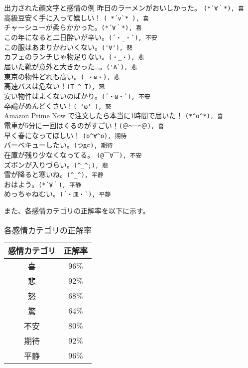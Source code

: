 \documentclass[11pt,a4j]{jsarticle}
\begin{document}
\begin{itembox}[l]{出力された顔文字と感情の例}
  昨日のラーメンがおいしかった。 \verb|(*´∀｀*), 喜| \\
高級豆安く手に入って嬉しい！ \verb|( *´v`* ), 喜| \\
チャーシューが柔らかかった。\verb|(*´∀｀*), 喜|\\
この年になると二日酔いが辛い。\verb|(´・_・`), 不安|\\
この服はあまりかわいくない。\verb|('∀'), 悲|\\
カフェのランチじゃ物足りない。\verb|(・_・), 悲|\\
届いた靴が意外と大きかった…。\verb|('A`), 悲|\\
東京の物件どれも高い。\verb|( ・ω・), 悲|\\
高速バスは危ない！\verb|(T ^ T), 怒|\\
安い物件はよくないのばかり。\verb|(´・ω・`), 不安|\\
卒論がめんどくさい！\verb|( 'ω' ), 怒|\\
Amazon Prime Now で注文したら本当に1時間で届いた！ \verb|(*^o^*), 喜|\\
電車が5分に一回はくるのがすごい！\verb|(＠⌒ー⌒＠), 喜|\\
早く春になってほしい！ \verb|(o^∀^o), 期待|\\
バーベキューしたい。\verb|(つд⊂), 期待|\\
在庫が残り少なくなってる。 \verb|(@￣∀￣), 不安|\\
ズボンが入りづらい。\verb|(^_^;), 悲|\\
雪が降ると寒いね。\verb|(^_^), 平静|\\
おはよう。\verb|(*´∀｀), 平静|\\
めっちゃねむい。\verb|(´・皿・`), 平静|\\
\end{itembox}

また、各感情カテゴリの正解率を以下に示す。

\begin{table}[h]
  \caption{各感情カテゴリの正解率}
  \centering
  \begin{tabular}{|c|c|} \hline
    感情カテゴリ & 正解率 \\ \hline \hline
    喜 & 96\% \\ \hline
    悲 & 92\% \\  \hline
    怒 & 68\% \\ \hline
    驚 & 64\% \\ \hline
    不安 & 80\% \\ \hline
    期待 & 92\% \\ \hline
    平静 & 96\% \\ \hline
  \end{tabular}
\end{table}
\end{document}
